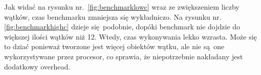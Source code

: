 Jak widać na rysunku nr.~\ref{fig:benchmarklowc} wraz ze zwiększeniem liczby wątków, czas benchmarku zmniejsza się wykładniczo. Na rysunku nr. \ref{fig:benchmarkhighc} dzieje się podobnie, dopóki benchmark nie dojdzie do większej ilości wątków niż 12. Wtedy, czas wykonywania lekko wzrasta. Może się to dziać ponieważ tworzone jest więcej obiektów wątku, ale nie są one wykorzystywane przez procesor, co sprawia, że niepotrzebnie nakładany jest dodatkowy overhead.
